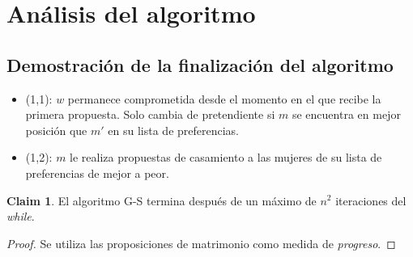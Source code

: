 \documentclass[12pt, fleqn]{article}
\theoremstyle{remark}
\theoremstyle{definition}
\newtheorem*{definition}{Claim}
\begin{document}
\section{Análisis del algoritmo}
\subsection{Demostración de la finalización del algoritmo}
\begin{itemize}
    \item (1,1): \(w\) permanece comprometida desde el momento en el que recibe la primera
            propuesta. Solo cambia de pretendiente si \(m\) se encuentra en mejor 
            posición que \(m'\) en su lista de preferencias.
    \item (1,2): \(m\) le realiza propuestas de casamiento a las mujeres de su 
            lista de preferencias de mejor a peor. 
\end{itemize}
\begin{definition}
    El algoritmo G-S termina después de un máximo de \(n^2\) iteraciones del \emph{while}.
\end{definition}
\begin{proof}
    Se utiliza las proposiciones de matrimonio como medida de \emph{progreso}.
\end{proof}
\end{document}
